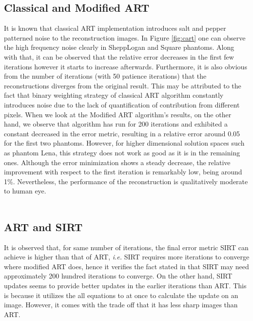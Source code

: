 \documentclass[journal]{IEEEtran}
\begin{document}
\subsection{Classical and Modified ART}
It is known that classical ART implementation introduces salt and pepper patterned noise to the reconstruction images. In Figure \ref*{fig:cart} one can observe the high frequency noise clearly in SheppLogan and Square phantoms. Along with that, it can be observed that the relative error decreases in the first few iterations however it starts to increase afterwards. Furthermore, it is also obvious from the number of iterations (with 50 patience iterations) that the reconstructions diverges from the original result. This may be attributed to the fact that binary weighting strategy of classical ART algorithm constantly introduces noise due to the lack of quantification of contribution from different pixels. When we look at the Modified ART algorithm's results, on the other hand, we observe that algorithm has run for 200 iterations and exhibited a constant decreased in the error metric, resulting in a relative error around 0.05 for the first two phantoms. However, for higher dimensional solution spaces such as phantom Lena, this strategy does not work as good as it is in the remaining ones. Although the error minimization shows a steady decrease, the relative improvement with respect to the first iteration is remarkably low, being around 1\%. Nevertheless, the performance of the reconstruction is qualitatively moderate to human eye.  
\\
\\
\subsection{ART and SIRT}
It is observed that, for same number of iterations, the final error metric SIRT can achieve is higher than that of ART, \textit{i.e.} SIRT requires more iterations to converge where modified ART does, hence it verifies the fact stated in \cite*{dong2020accelerated} that SIRT may need approximately 200 hundred iterations to converge.  On the other hand, SIRT updates seems to provide better updates in the earlier iterations than ART. This is because it utilizes the all equations to at once to calculate the update on an image. However, it comes with the trade off that it has less sharp images than ART. 
\\
\\
\end{document}
